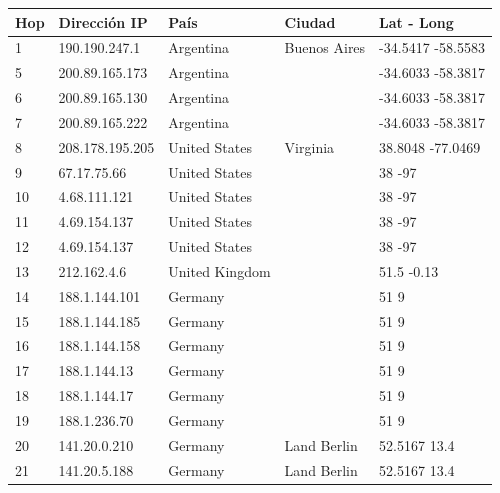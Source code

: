 \begin{center}
 \begin{tabular}{|l|l|l|l|l|}
    \hline
    Hop &Dirección IP &País &Ciudad &Lat - Long \\ \hline \hline
	1 & 190.190.247.1 & Argentina & Buenos Aires & -34.5417 -58.5583 \\ \hline
	5 & 200.89.165.173 & Argentina &  & -34.6033 -58.3817 \\ \hline
	6 & 200.89.165.130 & Argentina &  & -34.6033 -58.3817 \\ \hline
	7 & 200.89.165.222 & Argentina &  & -34.6033 -58.3817 \\ \hline
	8 & 208.178.195.205 & United States & Virginia & 38.8048 -77.0469 \\ \hline
	9 & 67.17.75.66 & United States &  & 38 -97 \\ \hline
	10 & 4.68.111.121 & United States &  & 38 -97 \\ \hline
	11 & 4.69.154.137 & United States &  & 38 -97 \\ \hline
	12 & 4.69.154.137 & United States &  & 38 -97 \\ \hline
	13 & 212.162.4.6 & United Kingdom &  & 51.5 -0.13 \\ \hline
	14 & 188.1.144.101 & Germany &  & 51 9 \\ \hline
	15 & 188.1.144.185 & Germany &  & 51 9 \\ \hline
	16 & 188.1.144.158 & Germany &  & 51 9 \\ \hline
	17 & 188.1.144.13 & Germany &  & 51 9 \\ \hline
	18 & 188.1.144.17 & Germany &  & 51 9 \\ \hline
	19 & 188.1.236.70 & Germany &  & 51 9 \\ \hline
	20 & 141.20.0.210 & Germany & Land Berlin & 52.5167 13.4 \\ \hline
	21 & 141.20.5.188 & Germany & Land Berlin & 52.5167 13.4 \\ \hline
 \end{tabular}
\end{center}


